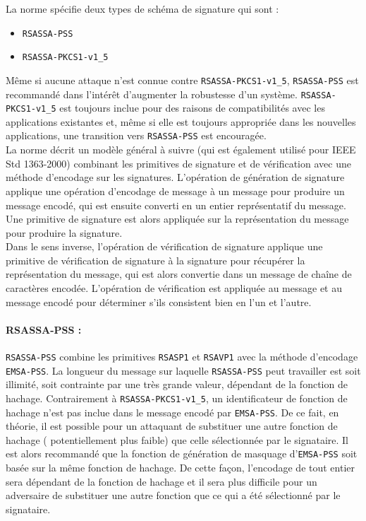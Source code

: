 La norme spécifie deux types de schéma de signature qui sont :
\begin{itemize}
\item \texttt{RSASSA-PSS}
\item \texttt{RSASSA-PKCS1-v1\_5} \\
\end{itemize}

Même si aucune attaque n'est connue contre \texttt{RSASSA-PKCS1-v1\_5},  \texttt{RSASSA-PSS} est recommandé dans l'intérêt d'augmenter la robustesse d'un système. \texttt{RSASSA-PKCS1-v1\_5} est toujours inclue pour des raisons de compatibilités avec les applications existantes et, même si elle est toujours appropriée dans les nouvelles applications, une transition vers \texttt{RSASSA-PSS} est encouragée.\\ 


La norme décrit un modèle général à suivre (qui est également utilisé pour IEEE Std 1363-2000) combinant les primitives de signature et de vérification avec une méthode d'encodage sur les signatures. L'opération de génération de signature applique une opération d'encodage de message à un message pour produire un message encodé, qui est ensuite converti en un entier représentatif du message. Une primitive de signature est alors appliquée sur la représentation du message pour produire la signature.\\ 


Dans le sens inverse, l'opération de vérification de signature applique une primitive de vérification de signature à la signature pour récupérer la représentation du message, qui est alors convertie dans un message de chaîne de caractères encodée. L'opération de vérification est appliquée au message et au message encodé pour déterminer s'ils  consistent bien en  l'un et l'autre.\\ 


\paragraph{RSASSA-PSS : \\}
\texttt{RSASSA-PSS} combine les primitives \texttt{RSASP1} et \texttt{RSAVP1} avec la méthode d'encodage \texttt{EMSA-PSS}. La longueur du message sur laquelle \texttt{RSASSA-PSS} peut travailler est soit illimité, soit contrainte par une très grande valeur, dépendant de la fonction de hachage. Contrairement à \texttt{RSASSA-PKCS1-v1\_5}, un identificateur de fonction de hachage n'est pas inclue dans le message encodé par \texttt{EMSA-PSS}. De ce fait, en théorie, il est possible pour un attaquant de substituer une autre fonction de hachage ( potentiellement plus faible) que celle sélectionnée par le signataire. Il est alors recommandé que la fonction de génération de masquage d'\texttt{EMSA-PSS}  soit basée sur la même fonction de hachage. De cette façon, l'encodage de tout entier sera dépendant de la fonction de hachage et il sera plus difficile pour un adversaire de substituer une autre fonction que ce qui a été sélectionné par le signataire.\\


